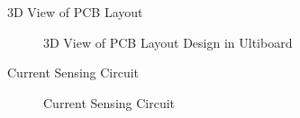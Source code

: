\begin{frame}{3D View of PCB Layout}
	\begin{figure}
		\centering


		\caption{3D View of PCB Layout Design in Ultiboard}

	\end{figure}
\end{frame}



\begin{frame}{Current Sensing Circuit}
	\begin{figure}
		\centering


		\caption{Current Sensing Circuit}
	\end{figure}
\end{frame}

